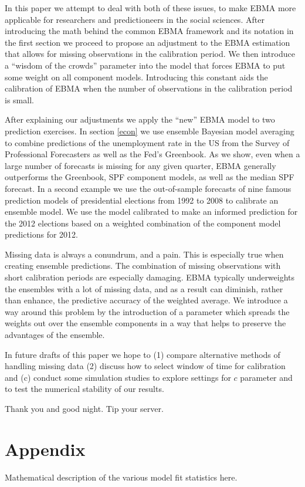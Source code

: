 \documentclass[12pt,fullpage,endnotes]{article}
\begin{document}
In this paper we attempt to deal with both of these issues, to make EBMA more applicable for researchers and predictioneers in the social sciences. After introducing the math behind the common EBMA framework and its notation in the first section we proceed to propose an adjustment to the EBMA estimation that allows for missing observations in the calibration period. We then introduce a ``wisdom of the crowds'' parameter into the model that forces EBMA to put some weight on all component models. Introducing this constant aids the calibration of EBMA when the number of observations in the calibration period is small. 

After explaining our adjustments we apply the ``new'' EBMA model to two prediction exercises. In section \ref{econ} we use ensemble Bayesian model averaging to combine predictions of the unemployment rate in the US from the Survey of Professional Forecasters as well as the Fed's Greenbook. As we show, even when a large number of forecasts is missing for any given quarter, EBMA generally outperforms the Greenbook, SPF component models, as well as the median SPF forecast. In a second example we use the out-of-sample forecasts of nine famous prediction models of presidential elections from 1992 to 2008 to calibrate an ensemble model. We use the model calibrated to make an informed prediction for the 2012 elections based on a weighted combination of the component model predictions for 2012.  

Missing data is always a conundrum, and a pain. This is especially true when creating ensemble predictions. The combination of missing observations with short calibration periods are especially damaging. EBMA typically underweights the ensembles with a lot of missing data, and as a result can diminish, rather than enhance, the predictive accuracy of the weighted average. We introduce a way around this problem by the introduction of a parameter which spreads the weights out over the ensemble components in a way that helps to preserve the advantages of the ensemble.  

In future drafts of this paper we hope to (1) compare alternative
methods of handling missing data (2) discuss how to select window of
time for calibration and (c) conduct some simulation studies to
explore settings for $c$ parameter and to test the numerical stability
of our results.

Thank you and good night. Tip your server.

 \newpage
 \appendix


 \section*{Appendix}

Mathematical description of the various model fit statistics here.  


\singlespacing


\end{document}
